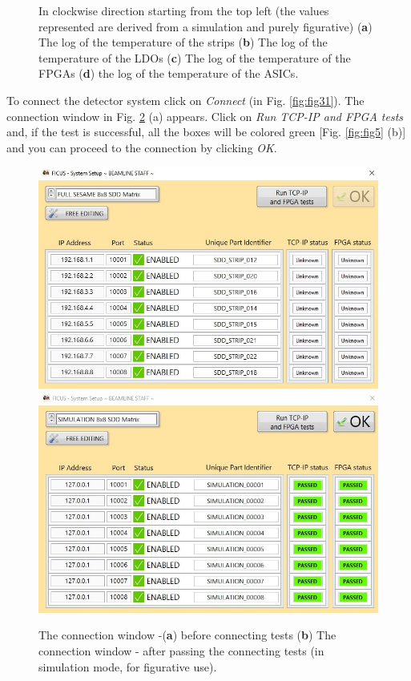 \documentclass[a4paper,12pt,oneside,pdflatex,italian,final,twocolumn]{article}
\begin{document}
\begin{figure}[h]
\caption{In clockwise direction starting from the top left (the values represented are derived from a simulation and purely figurative) (\textbf{a}) The log of the temperature of the strips (\textbf{b}) The log of the temperature of the LDOs (\textbf{c}) The log of the temperature of the FPGAs (\textbf{d}) the log of the temperature of the ASICs.}\label{fig:fig33}
\end{figure}
\clearpage 

To connect the detector system click on \textit{Connect} (in Fig. \ref{fig:fig31}). The connection window in Fig. \ref{fig:fig34} (a) appears. 
Click on \textit{Run TCP-IP and FPGA tests} and, if the test is successful, all the boxes will be colored green [Fig. \ref{fig:fig5} (b)] and you can proceed to the connection by clicking \textit{OK}.

\begin{figure}[h]
\centering
\subfloat
{\includegraphics[scale=0.5]{Cattura67.jpg}} \\
\subfloat
{\includegraphics[scale=0.5]{Cattura68.jpg}} \\
\caption{The connection window -(\textbf{a}) before connecting tests (\textbf{b}) The connection window - after passing the connecting tests (in simulation mode, for figurative use).}\label{fig:fig34}
\end{figure}
\end{document}
